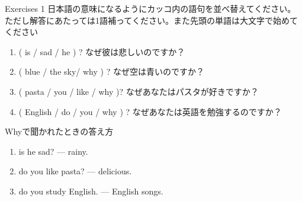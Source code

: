 \documentclass[aspectratio=169,xcolor={dvipsnames,table}]{beamer}
\begin{document}
\begin{frame}[plain]{Exercises 1}
日本語の意味になるようにカッコ内の語句を並べ替えてください。ただし解答にあたっては1語補ってください。また先頭の単語は大文字で始めてください
 \begin{enumerate}
  \item ( is / sad / he ) ? なぜ彼は悲しいのですか？\\
  \item ( blue / the sky/ why ) ? なぜ空は青いのですか？\\
  \item ( pasta / you / like / why )? なぜあなたはパスタが好きですか？\\
  \item ( English / do / you / why ) ? なぜあなたは英語を勉強するのですか？\\
 \end{enumerate}

\hfill{}
\end{frame}
\begin{frame}[plain]{Whyで聞かれたときの答え方}
 \begin{enumerate}
  \item {} is he sad? ---   rainy.
  \item {} do you like pasta? ---   delicious.
  \item {} do you study English. ---   English songs.
 \end{enumerate}


\hfill{}
\end{frame}
\end{document}
